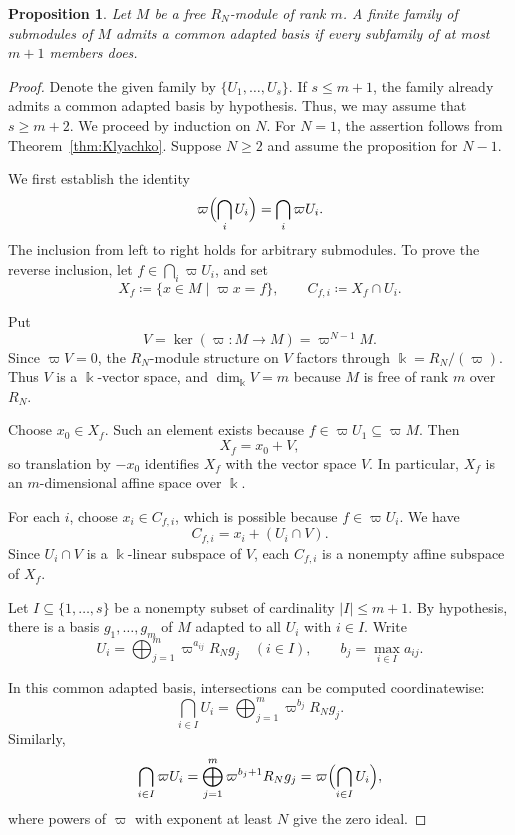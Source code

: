 \documentclass[12pt]{amsart}
\newtheorem{prop}[theorem]{Proposition}
\theoremstyle{definition}
\theoremstyle{remark}
\begin{document}
\begin{prop}\label{prop:alt-finite-module}
Let $M$ be a free $R_N$-module of rank $m$. A finite family of submodules of $M$ admits a common adapted basis if every subfamily of at most $m+1$ members does.
\end{prop}
\begin{proof}
Denote the given family by $\{U_1,\ldots,U_s\}$. If $s\leq m+1$, the family already admits a common
adapted basis by hypothesis. Thus, we may assume
that $s\geq m+2$. We proceed by induction on $N$.
For $N=1$, the assertion follows from Theorem~\ref{thm:Klyachko}. Suppose $N\geq2$ and assume the proposition for $N-1$.

We first establish the identity 
\begin{equation}
\label{eq:alt-image-intersection}
 \varpi\Bigl(\bigcap\limits_i U_i\Bigr)=\bigcap\limits_i\varpi U_i.
\end{equation}
The inclusion from left to right holds for arbitrary submodules. To prove the reverse inclusion, let $f\in\bigcap\limits_i\varpi U_i$, and set
\[
  X_f\coloneqq\{x\in M\mid\varpi x=f\},
  \qquad
  {C_{f,i}}\coloneqq X_f\cap U_i.
\]

Put
\[
  V=\ker(\varpi:M\to M)=\varpi^{N-1}M.
\]
Since $\varpi V=0$, the $R_N$-module structure on $V$ factors through $\Bbbk=R_N/(\varpi)$.
Thus $V$ is a $\Bbbk$-vector space, and
$\dim_{\Bbbk}V=m$ because $M$ is free of rank $m$
over $R_N$.

Choose $x_0\in X_f$. Such an element exists because
$f\in\varpi U_1\subseteq\varpi M$.
Then
\[
  X_f=x_0+V,
\]
so translation by $-x_0$ identifies $X_f$ with the vector space $V$. In particular, $X_f$ is an $m$-dimensional affine space over $\Bbbk$.

For each $i$, choose $x_i\in C_{f,i}$, which is possible because $f\in\varpi U_i$. We have
\[
  C_{f,i}=x_i+(U_i\cap V).
\]
Since $U_i\cap V$ is a $\Bbbk$-linear subspace of $V$, each $C_{f,i}$ is a nonempty affine subspace of $X_f$.

Let $I\subseteq\{1,\ldots,s\}$ be a nonempty subset of cardinality  $|I|\leq m+1$. By hypothesis, there is a basis $g_1,\ldots,g_m$ of $M$ adapted to all $U_i$ with $i\in I$.
Write
\[
  U_i=\bigoplus_{j=1}^m\varpi^{a_{ij}}R_Ng_j
  \quad (i\in I),
  \qquad
  b_j=\max_{i\in I}a_{ij}.
\]


In this common adapted basis, intersections can be computed coordinatewise:
\[
  \bigcap_{i\in I}U_i
  =\bigoplus_{j=1}^m\varpi^{b_j}R_Ng_j.
\]
Similarly,
\[
  \bigcap_{i\in I}\varpi U_i
  =\bigoplus_{j=1}^m\varpi^{b_j+1}R_Ng_j
  =\varpi\Bigl(\bigcap_{i\in I}U_i\Bigr),
\]
where powers of $\varpi$ with exponent at least $N$ give the zero ideal.


\end{proof}
\end{document}
